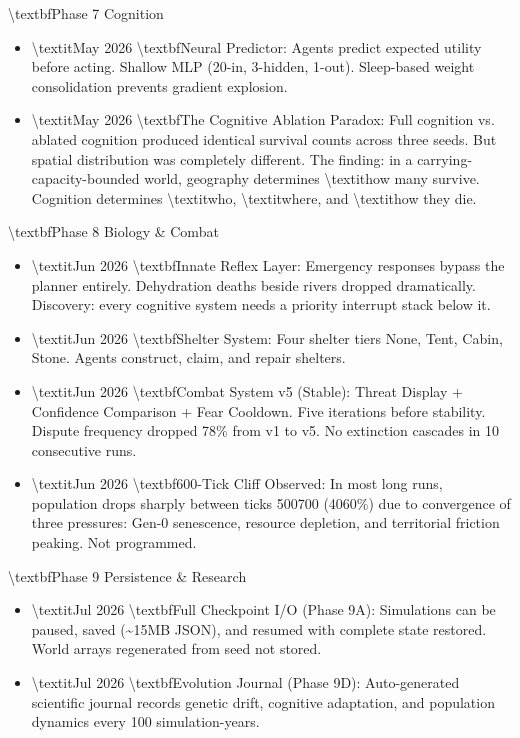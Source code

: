 \documentclass[11pt,a4paper]{article}
\begin{document}
\textbackslash{}textbf{Phase 7  Cognition}
\begin{itemize}
  \item \textbackslash{}textit{May 2026}  \textbackslash{}textbf{Neural Predictor}: Agents predict expected utility before acting. Shallow MLP (20-in, 3-hidden, 1-out). Sleep-based weight consolidation prevents gradient explosion.
  \item \textbackslash{}textit{May 2026}  \textbackslash{}textbf{The Cognitive Ablation Paradox}: Full cognition vs. ablated cognition produced identical survival counts across three seeds. But spatial distribution was completely different. The finding: in a carrying-capacity-bounded world, geography determines \textbackslash{}textit{how many} survive. Cognition determines \textbackslash{}textit{who}, \textbackslash{}textit{where}, and \textbackslash{}textit{how they die}.
\end{itemize}

\textbackslash{}textbf{Phase 8  Biology \& Combat}
\begin{itemize}
  \item \textbackslash{}textit{Jun 2026}  \textbackslash{}textbf{Innate Reflex Layer}: Emergency responses bypass the planner entirely. Dehydration deaths beside rivers dropped dramatically. Discovery: every cognitive system needs a priority interrupt stack below it.
  \item \textbackslash{}textit{Jun 2026}  \textbackslash{}textbf{Shelter System}: Four shelter tiers  None, Tent, Cabin, Stone. Agents construct, claim, and repair shelters.
  \item \textbackslash{}textit{Jun 2026}  \textbackslash{}textbf{Combat System v5 (Stable)}: Threat Display + Confidence Comparison + Fear Cooldown. Five iterations before stability. Dispute frequency dropped 78\% from v1 to v5. No extinction cascades in 10 consecutive runs.
  \item \textbackslash{}textit{Jun 2026}  \textbackslash{}textbf{600-Tick Cliff Observed}: In most long runs, population drops sharply between ticks 500700 (4060\%) due to convergence of three pressures: Gen-0 senescence, resource depletion, and territorial friction peaking. Not programmed.
\end{itemize}

\textbackslash{}textbf{Phase 9  Persistence \& Research}
\begin{itemize}
  \item \textbackslash{}textit{Jul 2026}  \textbackslash{}textbf{Full Checkpoint I/O (Phase 9A)}: Simulations can be paused, saved (\textasciitilde{}15MB JSON), and resumed with complete state restored. World arrays regenerated from seed  not stored.
  \item \textbackslash{}textit{Jul 2026}  \textbackslash{}textbf{Evolution Journal (Phase 9D)}: Auto-generated scientific journal records genetic drift, cognitive adaptation, and population dynamics every 100 simulation-years.
\end{itemize}
\end{document}
